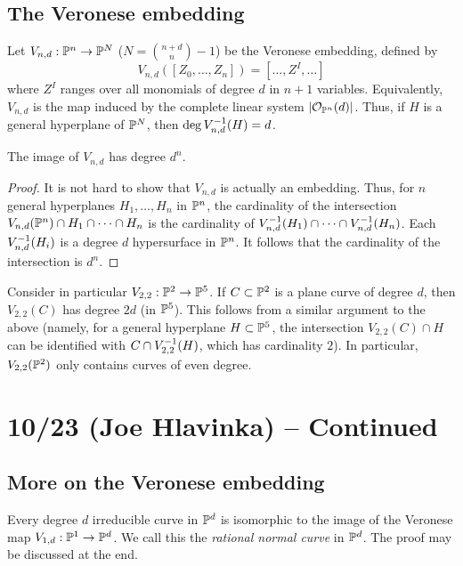 \documentclass{article}
\begin{document}
\subsection{The Veronese embedding}

Let $V_{n,d}: \mathbb{P}^n \to \mathbb{P}^N$ ($N = \binom{n+d}{n} - 1$) be the Veronese embedding, defined by
\[
	V_{n,d}([Z_0, \dots, Z_n]) = [\dots, Z^I, \dots]
\]
where $Z^I$ ranges over all monomials of degree $d$ in $n+1$ variables.
Equivalently, $V_{n,d}$ is the map induced by the complete linear system $|\mathcal{O}_{\mathbb{P}^n}(d)|$.
Thus, if $H$ is a general hyperplane of $\mathbb{P}^N$, then $\deg V_{n,d}^{-1}(H) = d$.

\begin{thm}
	The image of $V_{n,d}$ has degree $d^n$.
\end{thm}

\begin{proof}
	It is not hard to show that $V_{n,d}$ is actually an embedding.
	Thus, for $n$ general hyperplanes $H_1, \dots, H_{n}$ in $\mathbb{P}^n$, the cardinality of the intersection $V_{n,d}(\mathbb{P}^n) \cap H_1 \cap \dots \cap H_{n}$ is the cardinality of $V_{n,d}^{-1}(H_1) \cap \dots \cap V_{n,d}^{-1}(H_n)$.
	Each $V_{n,d}^{-1}(H_i)$ is a degree $d$ hypersurface in $\mathbb{P}^n$.
	It follows that the cardinality of the intersection is $d^n$.
\end{proof}

Consider in particular $V_{2,2}: \mathbb{P}^2 \to \mathbb{P}^5$.
If $C \subset \mathbb{P}^2$ is a plane curve of degree $d$, then $V_{2,2}(C)$ has degree $2d$ (in $\mathbb{P}^5$).
This follows from a similar argument to the above (namely, for a general hyperplane $H \subset \mathbb{P}^5$, the intersection $V_{2,2}(C) \cap H$ can be identified with $C \cap V_{2,2}^{-1}(H)$, which has cardinality $2$).
In particular, $V_{2,2}(\mathbb{P}^2)$ only contains curves of even degree.

\section{10/23 (Joe Hlavinka) -- Continued}

\subsection{More on the Veronese embedding}

Every degree $d$ irreducible curve in $\mathbb{P}^d$ is isomorphic to the image of the Veronese map $V_{1,d}: \mathbb{P}^1 \to \mathbb{P}^d$.
We call this the \emph{rational normal curve} in $\mathbb{P}^d$.
The proof may be discussed at the end.
\end{document}
